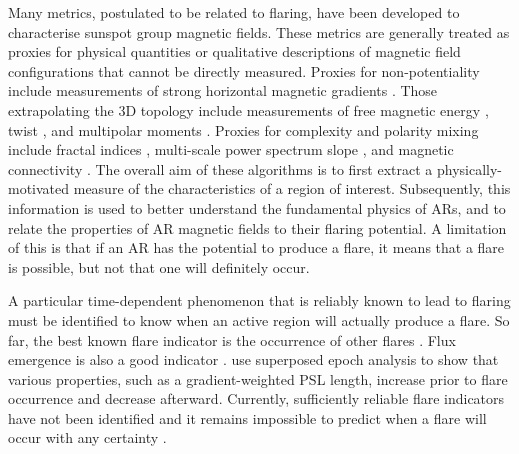 {Many metrics, postulated to be related to flaring, have been developed to characterise sunspot group magnetic fields. These metrics are generally treated as proxies for physical quantities or qualitative descriptions of magnetic field configurations that cannot be directly measured. Proxies for non-potentiality include measurements of strong horizontal magnetic gradients \citep{Gallagher:2002, Falconer:2008}. Those extrapolating the 3D topology include measurements of free magnetic energy \citep{Regnier_Priest:2007}, twist \citep{Conlon:2010b}, and multipolar moments \citep{Zhang:2009}.
Proxies for complexity and polarity mixing include fractal indices \citep{mcateer:2005b,Conlon:2008,Conlon:2010a}, multi-scale power spectrum slope \citep{Hewett:2008}, and magnetic connectivity \citep{Georgoulis:2007}.
The overall aim of these algorithms is to first extract a physically-motivated measure of the characteristics of a region of interest. Subsequently, this information is used to better understand the fundamental physics of \glspl{AR}, and to relate the properties of \gls{AR} magnetic fields to their flaring potential. A limitation of this is that if an AR has the potential to produce a flare, it means that a flare is possible, but not that one will definitely occur.

A particular time-dependent phenomenon that is reliably known to lead to flaring must be identified to know when an active region will actually produce a flare. So far, the best known flare indicator is the occurrence of other flares \citep{Gallagher:2002,Wheatland:2005}. Flux emergence is also a good indicator \citep{Li:2000,Schrijver:2005}. \citet{Mason:2010} use superposed epoch analysis to show that various properties, such as a gradient-weighted PSL length, increase prior to flare occurrence and decrease afterward. Currently, sufficiently reliable flare indicators have not been identified and it remains impossible to predict when a flare will occur with any certainty \cite{Messerotti:2009}.

}
